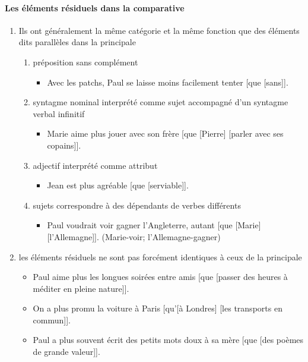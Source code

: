 \documentclass[UTF8]{report}
\begin{document}
\paragraph{Les éléments résiduels dans la comparative}
\begin{enumerate}
    \item Ils ont généralement la même catégorie et la même fonction que des éléments dits parallèles dans la principale
    \begin{enumerate}
        \item préposition sans complément
        \begin{itemize}
            \item Avec les patchs, Paul se laisse moins facilement tenter [que [sans]].
        \end{itemize}
        \item syntagme nominal interprété comme sujet accompagné d’un syntagme verbal infinitif
        \begin{itemize}
            \item Marie aime plus jouer avec son frère [que [Pierre] [parler avec ses copains]].
        \end{itemize}
        \item adjectif interprété comme attribut
        \begin{itemize}
            \item Jean est plus agréable [que [serviable]].
        \end{itemize}
        \item sujets correspondre à des dépendants de verbes différents
        \begin{itemize}
            \item Paul voudrait voir gagner l’Angleterre, autant [que [Marie] [l’Allemagne]]. (Marie-voir; l’Allemagne-gagner)
        \end{itemize}
    \end{enumerate}
    \item les éléments résiduels ne sont pas forcément identiques à ceux de la principale
    \begin{itemize}
        \item Paul aime plus les longues soirées entre amis [que [passer des heures à méditer en pleine nature]].
        \item On a plus promu la voiture à Paris [qu’[à Londres] [les transports en commun]].
        \item Paul a plus souvent écrit des petits mots doux à sa mère [que [des poèmes de grande valeur]].

\end{itemize}
\end{enumerate}
\end{document}
